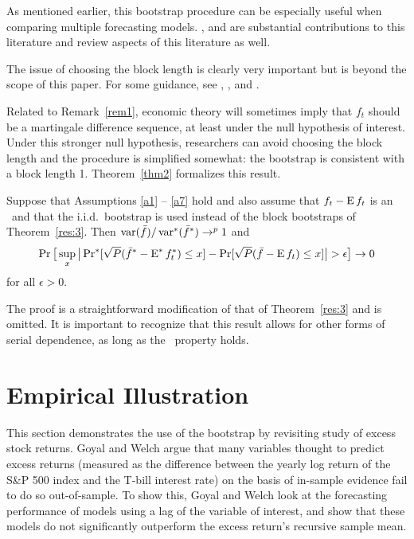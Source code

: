 \documentclass[12pt,fleqn]{article}
\begin{document}
\begin{rem}
  As mentioned earlier, this bootstrap procedure can be especially
  useful when comparing multiple forecasting models.  \cite{Whi:00},
  \cite{Han:05} and \cite{RoW:05} are substantial contributions to
  this literature and \cite{RSW:08} review aspects of this literature
  as well.
\end{rem}

\begin{rem}\label{rem1}
  The issue of choosing the block length is clearly very important but
  is beyond the scope of this paper. For some guidance, see
  \cite{PoW:04}, \cite{RoW:06}, and \cite{PPW:09}.
\end{rem}

Related to Remark~\ref{rem1}, economic theory will sometimes imply
that $f_t$ should be a martingale difference sequence, at least under
the null hypothesis of interest. Under this stronger null hypothesis,
researchers can avoid choosing the block length and the procedure is
simplified somewhat: the bootstrap is consistent with a block length 1.
Theorem~\ref{thm2} formalizes this result.

\begin{thm}\label{thm2}
  Suppose that Assumptions \ref{a1} -- \ref{a7} hold and also assume
  that $f_t - \operatorname{E} f_t$ is an \mds\ and that the i.i.d.\ bootstrap is
  used instead of the block bootstraps of Theorem~\ref{res:3}. Then
  $\operatorname{var}(\bar f)/\operatorname{var}^*(\bar f^*) \to^p 1$
  and
  \begin{equation}\label{eq:20}
    \operatorname{Pr}\big[\sup_x \big\lvert \operatorname{Pr}^*[\sqrt{P} (\bar f^* - \operatorname{E}^* f_t^*) \leq x]
    - \operatorname{Pr}[\sqrt{P}( \bar{f} - \operatorname{E} f_t) \leq x] \big\rvert > \epsilon\big] \to 0
  \end{equation}
  for all $\epsilon > 0$.
\end{thm}

The proof is a straightforward modification of that of
Theorem~\ref{res:3} and is omitted. It is important to recognize that
this result allows for other forms of serial dependence, as long as
the \mds\ property holds.

\section{Empirical Illustration}\label{sec:3}

This section demonstrates the use of the bootstrap by revisiting
 study of excess stock returns. Goyal and Welch argue
that many variables thought to predict excess returns (measured as the
difference between the yearly log return of the S\&P 500 index and the
T-bill interest rate) on the basis of in-sample evidence fail to do so
out-of-sample.  To show this, Goyal and Welch look at the forecasting
performance of models using a lag of the variable of interest, and
show that these models do not significantly outperform the excess
return's recursive sample mean.
\end{document}
